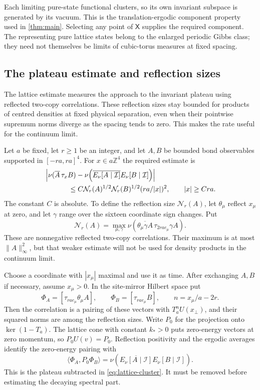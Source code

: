 \documentclass[11pt,letterpaper,reqno]{amsart}
\theoremstyle{definition}
\theoremstyle{remark}
\begin{document}
Each limiting pure-state functional clusters, so its own invariant
subspace is generated by its vacuum. This is the translation-ergodic
component property used in \cref{thm:main}. Selecting any point of
$\mathsf X$ supplies the required component. The representing pure
lattice states belong to the enlarged periodic Gibbs class; they need
not themselves be limits of cubic-torus measures at fixed spacing.

\subsection{The plateau estimate and reflection sizes}

The lattice estimate measures the approach to the invariant plateau
using reflected two-copy correlations. These reflection sizes stay
bounded for products of centred densities at fixed physical
separation, even when their pointwise supremum norms diverge as the
spacing tends to zero. This makes the rate useful for the continuum
limit.

Let $a$ be fixed, let $r\ge1$ be an integer, and let $A,B$ be bounded
bond observables supported in $[-ra,ra]^4$. For $x\in a\mathbb Z^4$
the required estimate is
\begin{align}\label{eq:lattice-cluster}
 &\left|\nu(\overline A\,\tau_xB)
 -\nu\!\left(\overline{E_\nu[A\mid\mathcal I]}
                         E_\nu[B\mid\mathcal I]\right)\right|
 \notag\\
 &\hspace{12mm}\le C\mathcal N_r(A)^{1/2}\mathcal N_r(B)^{1/2}
                         (ra/|x|)^2,
 \qquad |x|\ge Cra.
\end{align}
The constant $C$ is absolute. To define the reflection size
$\mathcal N_r(A)$, let $\theta_\mu$
reflect $x_\mu$ at zero, and let $\gamma$ range over the sixteen
coordinate sign changes. Put
\begin{equation}\label{eq:reflection-size}
 \mathcal N_r(A)=\max_{\mu,\gamma}
 \nu\!\left(\overline{\theta_\mu\gamma A}\,
                         \tau_{2rae_\mu}\gamma A\right).
\end{equation}
These are nonnegative reflected two-copy correlations. Their maximum
is at most $\|A\|_\infty^2$, but that weaker estimate will not be
used for density products in the continuum limit.

Choose a coordinate with $|x_\mu|$ maximal and use it as time.
After exchanging $A,B$ if necessary, assume $x_\mu>0$.
In the site-mirror Hilbert space put
\[
 \Phi_A=[\tau_{rae_\mu}\theta_\mu A],\qquad
 \Phi_B=[\tau_{rae_\mu}B],\qquad
 n=x_\mu/a-2r.
\]
Then the correlation is a pairing of these vectors with
$T_a^nU(x_\perp)$, and their squared norms are among the reflection
sizes. Write $P_0$ for the projection onto $\ker(1-T_a)$.
The lattice cone with constant $k_*>0$ puts zero-energy vectors at
zero momentum, so $P_0U(v)=P_0$. Reflection positivity and the
ergodic averages identify the zero-energy pairing with
\[
 \langle\Phi_A,P_0\Phi_B\rangle
   =\nu\!\left(\overline{E_\nu[A\mid\mathcal I]}
                              E_\nu[B\mid\mathcal I]\right).
\]
This is the plateau subtracted in \eqref{eq:lattice-cluster}.
It must be removed before estimating the decaying spectral part.
\end{document}
